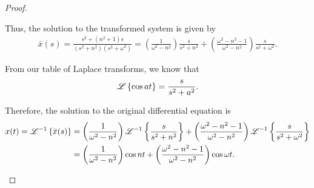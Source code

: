 \begin{proof}
\begin{enumerate}
      Thus, the solution to the transformed system is given by
      \begin{align*}
        \bar{x}(s) = \frac{s^3+(n^2+1)s}{(s^2 + n^2)(s^2+\omega^2)} =
        \left(\frac{1}{\omega^2 - n^2}\right)\frac{s}{s^2 + n^2} + \left(\frac{\omega^2 - n^2 -1}{\omega^2 - n^2}\right)\frac{s}{s^2 + \omega^2}.
      \end{align*}

      From our table of Laplace transforms, we know that
      \begin{align*}
        \mathscr{L}\left\{ {\cos a t} \right\} = \frac{s}{s^2 + a^2}.
      \end{align*}

      Therefore, the solution to the original differential equation is
      \begin{align*}
        x(t) = \mathscr{L}^{-1}\left\{ {\bar{x}(s)} \right\}
        &= \left(\frac{1}{\omega^2 - n^2}\right)\mathscr{L}^{-1}\left\{ {\frac{s}{s^2 + n^2}} \right\} + \left(\frac{\omega^2 - n^2 -1}{\omega^2 - n^2}\right)\mathscr{L}^{-1}\left\{ {\frac{s}{s^2 + \omega^2}} \right\} \\
        &= \left(\frac{1}{\omega^2 - n^2}\right)\cos n t + \left(\frac{\omega^2 - n^2 -1}{\omega^2 - n^2}\right)\cos \omega t.
      \end{align*}
  \end{enumerate}
\end{proof}
\newpage
